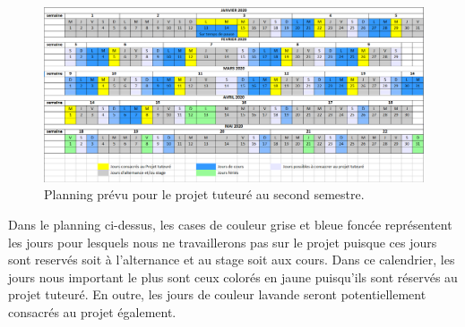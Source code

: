 \documentclass[a4paper, 12pt]{book}
\begin{document}
\begin{center}
	\begin{figure}[H]
  		\hspace{-1.5cm}
 		\includegraphics[scale=0.5]{images/Planning.png} \hspace{2cm}
  		\caption{Planning prévu pour le projet tuteuré au second semestre.\label{fig-planning}}
	\end{figure}
\end{center}

\par Dans le planning ci-dessus, les cases de couleur grise et bleue foncée représentent les jours pour lesquels nous ne travaillerons pas sur le projet puisque ces jours sont reservés soit  à l'alternance et au stage soit aux cours.  Dans ce calendrier, les jours nous important le plus sont ceux colorés en jaune puisqu'ils sont réservés au projet tuteuré. En outre, les jours de couleur lavande seront potentiellement consacrés au projet également. 


\nocite{*}
%	
%
\printbibliography
\end{document}

